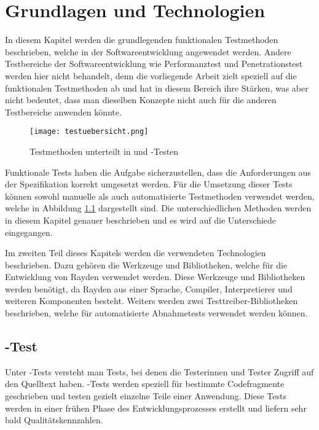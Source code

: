 \chapter{Grundlagen und Technologien}
\label{cha:StandDerTechnik}

In diesem Kapitel werden die grundlegenden funktionalen Testmethoden beschrieben, welche in der Softwareentwicklung angewendet werden. Andere Testbereiche der Softwareentwicklung wie Performanztest und Penetrationstest werden hier nicht behandelt, denn die vorliegende Arbeit zielt speziell auf die funktionalen Testmethoden ab und hat in diesem Bereich ihre Stärken, was aber nicht bedeutet, dass man dieselben Konzepte nicht auch für die anderen Testbereiche anwenden könnte. 


\begin{figure}
\centering
\texttt{[image: testuebersicht.png]}
\caption{Testmethoden unterteilt in  und -Testen}
\label{fig:testtypen}
\end{figure}

\SuperPar
Funktionale Tests haben die Aufgabe sicherzustellen, dass die Anforderungen aus der Spezifikation korrekt umgesetzt werden. Für die Umsetzung dieser Tests können sowohl manuelle als auch automatisierte Testmethoden verwendet werden, welche in Abbildung \ref{fig:testtypen} dargestellt sind. Die unterschiedlichen Methoden werden in diesem Kapitel genauer beschrieben und es wird auf die Unterschiede eingegangen.

\SuperPar
Im zweiten Teil dieses Kapitels werden die verwendeten Technologien beschrieben. Dazu gehören die Werkzeuge und Bibliotheken, welche für die Entwicklung von Rayden verwendet werden. Diese Werkzeuge und Bibliotheken werden benötigt, da Rayden aus einer Sprache, Compiler, Interpretierer und weiteren Komponenten besteht. Weiters werden zwei Testtreiber-Bibliotheken beschrieben, welche für automatisierte Abnahmetests verwendet werden können. 

\section{-Test}

Unter -Tests versteht man Tests, bei denen die Testerinnen und Tester Zugriff auf den Quelltext haben. -Tests werden speziell für bestimmte Codefragmente geschrieben und testen gezielt einzelne Teile einer Anwendung. Diese Tests werden in einer frühen Phase des Entwicklungsprozesses erstellt und liefern sehr bald Qualitätskennzahlen. 

